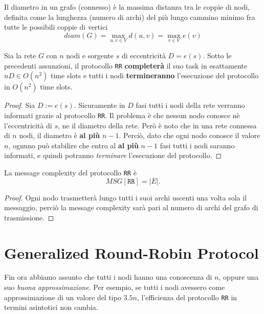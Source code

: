 \begin{definizione}[Diametro]
    Il diametro in un grafo (connesso) è la massima distanza tra le coppie di nodi, definita come la lunghezza (numero di archi) del più lungo cammino minimo fra tutte le possibili coppie di vertici
    \[
        diam(G) = \max_{u,v \in V} d(u,v) = \max_{v \in V} e(v)
    \]
\end{definizione}

\begin{teorema}
    Sia la rete $G$ con $n$ nodi e sorgente $s$ di eccentricità $D = e(s)$. Sotto le precedenti assunzioni, il protocollo \texttt{RR} \textbf{completerà} il suo task in esattamente $nD \in O(n^2)$ time slots e tutti i nodi \textbf{termineranno} l'esecuzione del protocollo in $O(n^2)$ time slots.
    \begin{proof}
        Sia $D := e(s)$. Sicuramente in $D$ fasi tutti i nodi della rete verranno informati grazie al protocollo \texttt{RR}. Il problema è che nessun nodo conosce nè l'eccentricità di $s$, ne il diametro della rete. Però è noto che in una rete connessa di $n$ nodi, il diametro è \textbf{al più} $n - 1$. Perciò, dato che ogni nodo conosce il valore $n$, ognuno può stabilire che entro al \textbf{al più} $n-1$ fasi tutti i nodi saranno informati, e quindi potranno \textit{terminare} l'esecuzione del protocollo.
    \end{proof}
\end{teorema}

\begin{teorema}
    La message complexity del protocollo \texttt{RR} è 
    \[
        MSG[\texttt{RR}] = |E|.
    \]
    \begin{proof}
        Ogni nodo trasmetterà lungo tutti i suoi archi uscenti una volta sola il messaggio, perciò la message complexity sarà pari al numero di archi del grafo di trasmissione.
    \end{proof}
\end{teorema}

\section{Generalized Round-Robin Protocol}

Fin ora abbiamo assunto che tutti i nodi hanno una conoscenza di $n$, oppure una suo \textit{buona approssimazione}. Per esempio, se tutti i nodi avessero come approssimazione di un valore del tipo $3.5n$, l'efficienza del protocollo \texttt{RR} in termini asintotici non cambia.

